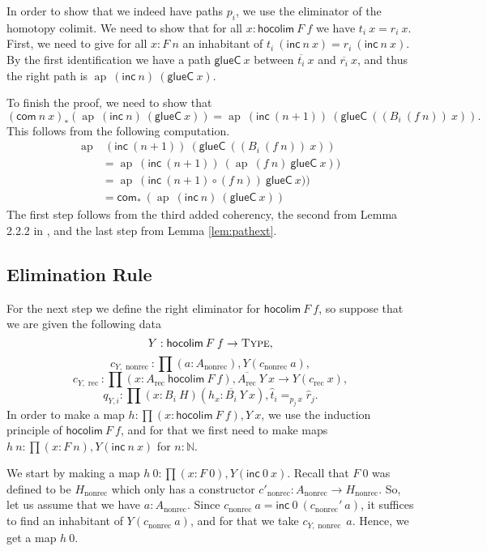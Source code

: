 \documentclass[a4paper,UKenglish]{lipics-v2016}
\newcommand{\Boperator}[1]{\mathsf{#1}}
\newcommand{\rec}[0]{\operatorname{rec}}
\newcommand{\nonrec}[0]{\operatorname{nonrec}}
\newcommand{\ap}[0]{\operatorname{ap}}
\newcommand{\glueC}[0]{\Boperator{glueC}}
\newcommand{\hocolim}[0]{\Boperator{hocolim}}
\newcommand{\inc}[0]{\Boperator{inc}}
\newcommand{\com}[0]{\Boperator{com}}
\newcommand{\Type}[0]{\operatorname{\textsc{Type}}}
\newcommand{\dak}[1]{\widehat{#1}}
\newcommand{\hatt}{\dak{t}}
\newcommand{\hatr}{\dak{r}}
\begin{document}
In order to show that we indeed have paths $p_i$, we use the eliminator of the homotopy colimit.
We need to show that for all $x : \hocolim \> F \> f$ we have $t_i \> x = r_i \> x$. 
First, we need to give for all $x : F \> n$ an inhabitant of $t_i \> (\inc \> n \> x) = r_i \> (\inc \> n \> x)$.
By the first identification we have a path $\glueC \> x$ between $\overline{t_i} \> x$ and $\overline{r_i} \> x$, and thus the right path is $\ap \> (\inc \> n) \> (\glueC \> x)$. 

To finish the proof, we need to show that 
\[
(\com \> n \> x)_*(\ap \> (\inc \> n) \> (\glueC \> x)) = \ap \> (\inc \> (n+1)) \> (\glueC \> ((B_i \>(f \>n)) \> x)).
\]
This follows from the following computation.
\begin{equation*}
\begin{split}
\ap &\> (\inc \> (n+1)) \> (\glueC \> ((B_i \>(f \> n)) \> x))\\
&= \ap \> (\inc \> (n+1)) \> (\ap \> (f \> n) \>\glueC \> x))\\
&= \ap \> (\inc \> (n+1) \circ (f \> n)) \>\glueC \> x))\\
&=\com_* \> (\ap \> (\inc \> n) \> (\glueC \> x))
\end{split}
\end{equation*}
The first step follows from the third added coherency, the second from Lemma 2.2.2 in \cite{hottbook}, and the last step from Lemma \ref{lem:pathext}.


\subsection{Elimination Rule}
For the next step we define the right eliminator for $\hocolim \> F \> f$, so suppose that we are given the following data
\[
Y : \hocolim \> F \> f \rightarrow \Type,
\]
\[
c_{Y, \nonrec} : \prod (a : A_{\nonrec}), Y(c_{\nonrec} \> a),
\]
\[
c_{Y, \rec} : \prod (x : A_{\rec} \> \hocolim \> F \> f), \overline{A_{\rec}} \> Y \> x \rightarrow Y(c_{\rec} \> x),
\]
\[
q_{Y, i} : \prod (x : B_i \> H)(h_x : \overline{B_i} \> Y \> x), \hatt_i =_{p_j \, x} \hatr_j.
\]
In order to make a map $h : \prod (x : \hocolim \> F \> f), Y \> x$, we use the induction principle of $\hocolim \> F \> f$, and for that we first need to make maps $h \> n : \prod (x : F \> n), Y(\inc \> n \> x)$ for $n : \mathbb{N}$.

We start by making a map $h \> 0 : \prod (x : F \> 0), Y(\inc \> 0 \> x)$.
Recall that $F \> 0$ was defined to be $H_{\nonrec}$ which only has a constructor $c'_{\nonrec} : A_{\nonrec} \rightarrow H_{\nonrec}$.
So, let us assume that we have $a : A_{\nonrec}$.
Since $c_{\nonrec} \> a = \inc \> 0 \> (c_{\nonrec}' \> a)$, it suffices to find an inhabitant of $Y(c_{\nonrec} \> a)$, and for that we take $c_{Y, \nonrec} \> a$.
Hence, we get a map $h \> 0$.
\end{document}
